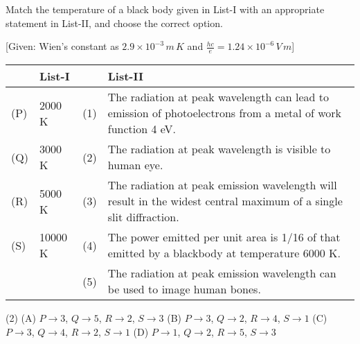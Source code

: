 \item Match the temperature of a black body given in List-I with an appropriate statement in List-II, and choose the correct option.
        
        [Given: Wien's constant as $2.9 \times 10^{-3}\,m\,K$ and $\frac{hc}{e} = 1.24 \times 10^{-6}\,V\,m$]
    
        \begin{center}
            \renewcommand{\arraystretch}{2}
            \begin{table}[h]
                \centering
                \begin{tabular}{p{0.25cm}p{4cm}|p{0.25cm}p{9cm}}
                \hline
                & List-I & & List-II \\
                \hline
                (P)& 2000 K & (1) &The radiation at peak wavelength can lead to emission of photoelectrons from a metal of work function 4 eV.\\
                (Q)& 3000 K & (2) &The radiation at peak wavelength is visible to human eye.\\
                (R)& 5000 K & (3) &The radiation at peak emission wavelength will result in the widest central maximum of a single slit diffraction.\\
                (S)& 10000 K & (4) &The power emitted per unit area is 1/16 of that emitted by a blackbody at temperature 6000 K.\\
                &          & (5) &The radiation at peak emission wavelength can be used to image human bones.\\
                \hline
                \end{tabular}
            \end{table}
        \end{center}
    
        \begin{tasks}(2)
            \task (A) \(P \rightarrow 3\), \(Q \rightarrow 5\), \(R \rightarrow 2\), \(S \rightarrow 3\)
            \task (B) \(P \rightarrow 3\), \(Q \rightarrow 2\), \(R \rightarrow 4\), \(S \rightarrow 1\)
            \task (C) \(P \rightarrow 3\), \(Q \rightarrow 4\), \(R \rightarrow 2\), \(S \rightarrow 1\) \ans
            \task (D) \(P \rightarrow 1\), \(Q \rightarrow 2\), \(R \rightarrow 5\), \(S \rightarrow 3\)
        \end{tasks}